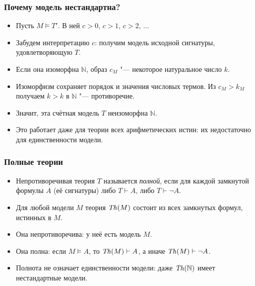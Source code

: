 \documentclass[10pt]{beamer}
\begin{document}
\begin{frame}
    \frametitle{Почему модель нестандартна?}
    \begin{itemize}
        \item Пусть $M\vDash T'$. В ней $c>0$, $c>1$, $c>2$, $\ldots$
        \item Забудем интерпретацию $c$: получим модель исходной сигнатуры, удовлетворяющую $T$. \pause
        \item Если она изоморфна $\mathbb{N}$, образ $c_M$ "--- некоторое натуральное число $k$.
        \item Изоморфизм сохраняет порядок и значения числовых термов. Из $c_M>k_M$ получаем $k>k$ в $\mathbb{N}$ "--- противоречие. \pause
        \item Значит, эта счётная модель $T$ неизоморфна $\mathbb{N}$.
        \item Это работает даже для теории всех арифметических истин: их недостаточно для единственности модели.
    \end{itemize}
\end{frame}

\begin{frame}
    \frametitle{Полные теории}
    \begin{itemize}
        \item Непротиворечивая теория $T$ называется \emph{полной}, если для каждой замкнутой формулы $A$ (её сигнатуры) либо $T \vdash A$, либо $T \vdash \neg A$.
        \item Для любой модели $M$ теория $\mathit{Th}(M)$ состоит из всех замкнутых формул, истинных в $M$.
        \item Она непротиворечива: у неё есть модель $M$. \pause
        \item Она полна: если $M\vDash A$, то $\mathit{Th}(M)\vdash A$, а иначе $\mathit{Th}(M)\vdash\neg A$.
        \item Полнота не означает единственности модели: даже $\mathit{Th}(\mathbb{N})$ имеет нестандартные модели.
    \end{itemize}
\end{frame}
\end{document}
